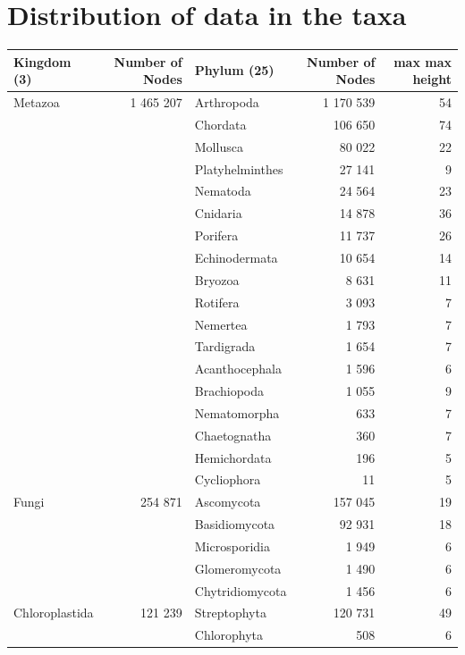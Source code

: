   \section{Distribution of data in the taxa}\label{sec:taxaTable1}
    \begin{center}
      \begin{tabular}{ |l|r|l|r|r| }
        \hline
        Kingdom (3) & Number of Nodes & Phylum (25) & Number of Nodes & max max height \\
        \hline \hline
        Metazoa & 1 465 207 & Arthropoda & 1 170 539 & 54 \\
        & & Chordata & 106 650 & 74 \\
        & & Mollusca & 80 022 & 22 \\
        & & Platyhelminthes & 27 141 & 9 \\
        & & Nematoda & 24 564 & 23 \\
        & & Cnidaria & 14 878 & 36 \\
        & & Porifera & 11 737 & 26 \\
        & & Echinodermata & 10 654 & 14 \\
        & & Bryozoa & 8 631 & 11 \\
        & & Rotifera & 3 093 & 7 \\
        & & Nemertea & 1 793 & 7 \\
        & & Tardigrada & 1 654 & 7 \\
        & & Acanthocephala & 1 596 & 6 \\
        & & Brachiopoda & 1 055 & 9 \\
        & & Nematomorpha & 633 & 7 \\
        & & Chaetognatha & 360 & 7 \\
        & & Hemichordata & 196 & 5 \\ 
        & & Cycliophora & 11 & 5 \\ 
        Fungi & 254 871 & Ascomycota & 157 045 & 19 \\ 
        & & Basidiomycota & 92 931 & 18 \\
        & & Microsporidia & 1 949 & 6 \\ 
        & & Glomeromycota & 1 490 & 6 \\
        & & Chytridiomycota & 1 456 & 6 \\
        \hline
        Chloroplastida & 121 239 & Streptophyta & 120 731 & 49 \\
        & & Chlorophyta & 508 & 6 \\
        \hline  
      \end{tabular}
    \end{center}

